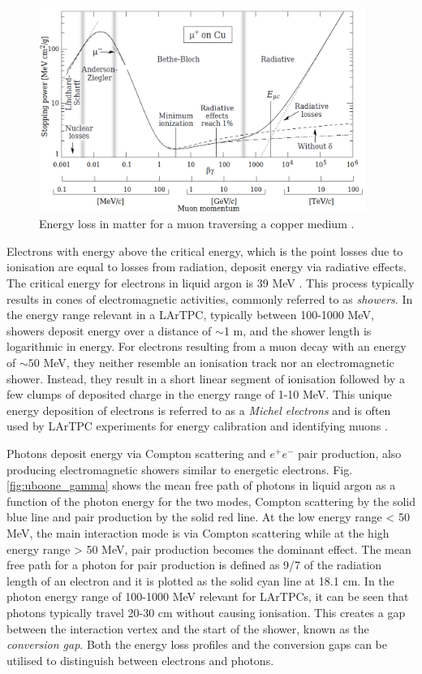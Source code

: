 \begin{figure}[ht!] 
\centering    
\includegraphics[width=0.95\textwidth]{BetheBloch}
\caption[Muon Energy Loss in a Copper Medium]{
Energy loss in matter for a muon traversing a copper medium \cite{Passage}.
}
\label{fig:BetheBloch}
\end{figure}

Electrons with energy above the critical energy, which is the point losses due to ionisation are equal to losses from radiation, deposit energy via radiative effects.
The critical energy for electrons in liquid argon is 39 MeV \cite{uboone_gamma}.
This process typically results in cones of electromagnetic activities, commonly referred to as \textit{showers}.
In the energy range relevant in a LArTPC, typically between 100-1000 MeV, showers deposit energy over a distance of $\sim$1 m, and the shower length is logarithmic in energy.
For electrons resulting from a muon decay with an energy of $\sim50$ MeV, they neither resemble an ionisation track nor an electromagnetic shower.
Instead, they result in a short linear segment of ionisation followed by a few clumps of deposited charge in the energy range of 1-10 MeV.
This unique energy deposition of electrons is referred to as a \textit{Michel electrons} and is often used by LArTPC experiments for energy calibration and identifying muons  \cite{uboone_michel}.

Photons deposit energy via Compton scattering and $e^+e^-$ pair production, also producing electromagnetic showers similar to energetic electrons.
Fig. \ref{fig:uboone_gamma} shows the mean free path of photons in liquid argon as a function of the photon energy for the two modes, Compton scattering by the solid blue line and pair production by 
the solid red line.
At the low energy range < 50 MeV, the main interaction mode is via Compton scattering while at the high energy range > 50 MeV, pair production becomes the dominant effect.
The mean free path for a photon for pair production is defined as 9/7 of the radiation length of an electron and it is plotted as the solid cyan line at 18.1 cm.
In the photon energy range of 100-1000 MeV relevant for LArTPCs, it can be seen that photons typically travel 20-30 cm without causing ionisation.
This creates a gap between the interaction vertex and the start of the shower, known as the \textit{conversion gap}.
Both the energy loss profiles and the conversion gaps can be utilised to distinguish between electrons and photons. 

